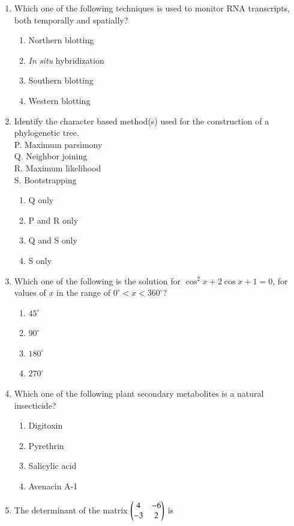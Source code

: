 \documentclass[journal,12pt,onecolumn]{IEEEtran}
\theoremstyle{remark}
\begin{document}
\begin{enumerate}
    \item Which one of the following techniques is used to monitor RNA transcripts, both temporally and spatially?
   
    \begin{enumerate}
        \item Northern blotting
        \item \textit{In situ} hybridization
        \item Southern blotting
        \item Western blotting
    \end{enumerate}
    

    \item Identify the character based method(s) used for the construction of a phylogenetic tree.\\
    P. Maximum parsimony\\
    Q. Neighbor joining\\
    R. Maximum likelihood\\
    S. Bootstrapping
    \begin{multicols}{2}
    \begin{enumerate}
        \item Q only
        \item P and R only
        \item Q and S only
        \item S only
    \end{enumerate}
    \end{multicols}

    \item Which one of the following is the solution for $\cos^2x + 2\cos x + 1 = 0$, for values of $x$ in the range of $0^\circ < x < 360^\circ$?
    \begin{multicols}{4}
    \begin{enumerate}
        \item $45^\circ$
        \item $90^\circ$
        \item $180^\circ$
        \item $270^\circ$
    \end{enumerate}
    \end{multicols}

    \item Which one of the following plant secondary metabolites is a natural insecticide?
    \begin{multicols}{4}
    \begin{enumerate}
        \item Digitoxin
        \item Pyrethrin
        \item Salicylic acid
        \item Avenacin A-1
    \end{enumerate}
    \end{multicols}
    \item The determinant of the matrix
    $
        \begin{pmatrix}
            4 & -6 \\
            -3 & 2
        \end{pmatrix}
    $
    is \underline{\hspace{2cm}}
    

\end{enumerate}
\end{document}
